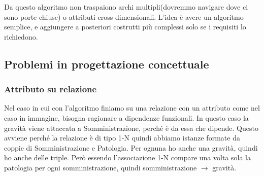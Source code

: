\begin{warn}
	Da questo algoritmo non traspaiono archi multipli(dovremmo navigare dove ci sono porte chiuse) o attributi cross-dimensionali. L'idea è avere un algoritmo semplice, e aggiungere a posteriori costrutti più complessi solo se i requisiti lo richiedono.
\end{warn}
\subsection{Problemi in progettazione concettuale}
\subsubsection{Attributo su relazione}
Nel caso in cui con l'algoritmo finiamo su una relazione con un attributo come nel caso in immagine, bisogna ragionare a dipendenze funzionali. In questo caso la gravità viene attaccata a Somministrazione, perché è da essa che dipende. Questo avviene perché la relazione è di tipo 1-N quindi abbiamo istanze formate da coppie di Somministrazione e Patologia. Per ognuna ho anche una gravità, quindi ho anche delle triple. Però essendo l'associazione 1-N compare una volta sola la patologia per ogni somministrazione, quindi somministrazione $\xrightarrow{}$ gravità.
